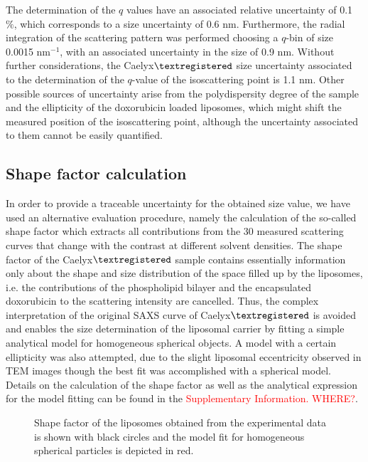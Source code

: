 The determination of the $q$ values have an associated relative uncertainty of 0.1 $\%$, which corresponds to a size uncertainty of 0.6 nm. Furthermore, the radial integration of the scattering pattern was performed choosing a $q$-bin of size 0.0015 nm$^{-1}$, with an associated uncertainty in the size of 0.9 nm. Without further considerations, the Caelyx$\textregistered$ size uncertainty associated to the determination of the $q$-value of the isoscattering point is 1.1 nm. Other possible sources of uncertainty arise from the polydispersity degree of the sample and the ellipticity of the doxorubicin loaded liposomes, which might shift the measured position of the isoscattering point, although the uncertainty associated to them cannot be easily quantified. 

\subsection{Shape factor calculation}
In order to provide a traceable uncertainty for the obtained size value, we have used an alternative evaluation procedure, namely the calculation of the so-called shape factor which extracts all contributions from the 30 measured scattering curves that change with the contrast at different solvent densities. The shape factor of the Caelyx$\textregistered$ sample contains essentially information only about the shape and size distribution of the space filled up by the liposomes, i.e. the contributions of the phospholipid bilayer and the encapsulated doxorubicin to the scattering intensity are cancelled.  Thus, the complex interpretation of the original SAXS curve of Caelyx$\textregistered$ is avoided and enables the size determination of the liposomal carrier by fitting a simple analytical model for homogeneous spherical objects. A model with a certain ellipticity was also attempted, due to the slight liposomal eccentricity observed in TEM images though the best fit was accomplished with a spherical model. Details on the calculation of the shape factor as well as the analytical expression for the model fitting can be found in the \textcolor{red}{Supplementary Information.  WHERE?}. 

\begin{figure}
	\centering
		
		\caption{Shape factor of the liposomes obtained from the experimental data is shown with black circles and the model fit for homogeneous spherical particles is depicted in red.}
		\label{fig:CaelyxIodixanolResonantTerm}
\end{figure}

